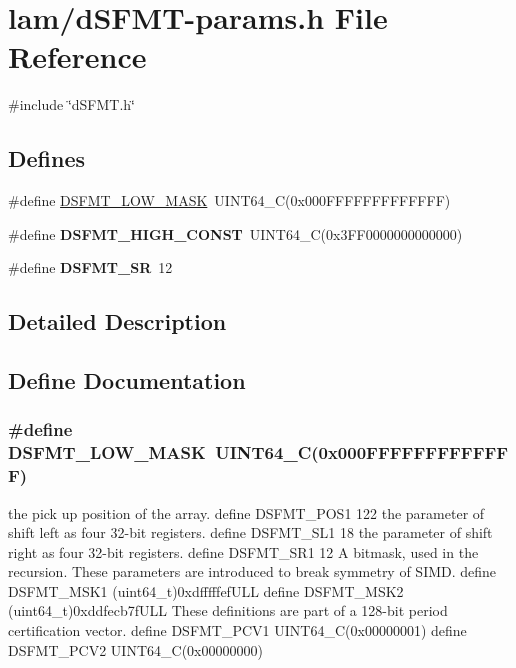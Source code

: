 \hypertarget{dSFMT-params_8h}{
\section{lam/dSFMT-\/params.h File Reference}
\label{dSFMT-params_8h}
}
{\ttfamily \#include \char`\"{}dSFMT.h\char`\"{}}\par
\subsection*{Defines}
\begin{DoxyCompactItemize}
\item 
\#define \hyperlink{dSFMT-params_8h_a57989a561514d3856d95cc1482420325}{DSFMT\_\-LOW\_\-MASK}~UINT64\_\-C(0x000FFFFFFFFFFFFF)
\item 
\hypertarget{dSFMT-params_8h_aee5e164dcb918963608d48e61a827e5c}{
\#define {\bfseries DSFMT\_\-HIGH\_\-CONST}~UINT64\_\-C(0x3FF0000000000000)}
\label{dSFMT-params_8h_aee5e164dcb918963608d48e61a827e5c}

\item 
\hypertarget{dSFMT-params_8h_a11b3082d55b2a939a40d1cb3f5cbba5f}{
\#define {\bfseries DSFMT\_\-SR}~12}
\label{dSFMT-params_8h_a11b3082d55b2a939a40d1cb3f5cbba5f}

\end{DoxyCompactItemize}


\subsection{Detailed Description}


\subsection{Define Documentation}
\hypertarget{dSFMT-params_8h_a57989a561514d3856d95cc1482420325}{
\subsubsection[{DSFMT\_\-LOW\_\-MASK}]{\setlength{\rightskip}{0pt plus 5cm}\#define DSFMT\_\-LOW\_\-MASK~UINT64\_\-C(0x000FFFFFFFFFFFFF)}}
\label{dSFMT-params_8h_a57989a561514d3856d95cc1482420325}
the pick up position of the array. define DSFMT\_\-POS1 122 the parameter of shift left as four 32-\/bit registers. define DSFMT\_\-SL1 18 the parameter of shift right as four 32-\/bit registers. define DSFMT\_\-SR1 12 A bitmask, used in the recursion. These parameters are introduced to break symmetry of SIMD. define DSFMT\_\-MSK1 (uint64\_\-t)0xdfffffefULL define DSFMT\_\-MSK2 (uint64\_\-t)0xddfecb7fULL These definitions are part of a 128-\/bit period certification vector. define DSFMT\_\-PCV1 UINT64\_\-C(0x00000001) define DSFMT\_\-PCV2 UINT64\_\-C(0x00000000) 
